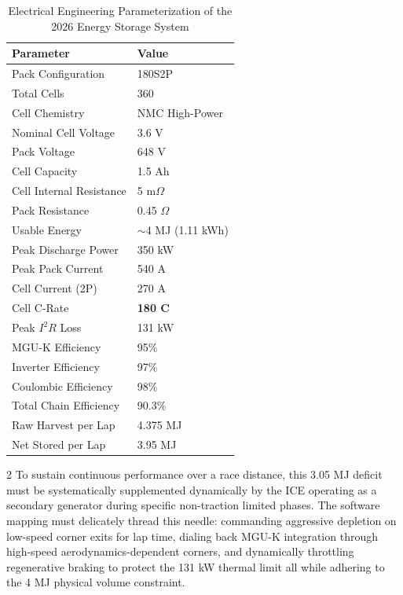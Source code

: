 \begin{table}[H]
\centering
\caption{Electrical Engineering Parameterization of the 2026 Energy Storage System}
\vspace{0.2cm}
\begin{tabularx}{\textwidth}{@{}XX@{}}
\toprule
\textbf{Parameter} & \textbf{Value} \\
\midrule
Pack Configuration & 180S2P \\
Total Cells & 360 \\
Cell Chemistry & NMC High-Power \\
Nominal Cell Voltage & 3.6 V \\
Pack Voltage & 648 V \\
Cell Capacity & 1.5 Ah \\
Cell Internal Resistance & 5 m$\Omega$ \\
Pack Resistance & 0.45 $\Omega$ \\
Usable Energy & $\sim$4 MJ (1.11 kWh) \\
Peak Discharge Power & 350 kW \\
Peak Pack Current & 540 A \\
Cell Current (2P) & 270 A \\
Cell C-Rate & \textbf{180 C} \\
Peak $I^2R$ Loss & 131 kW \\
MGU-K Efficiency & 95\% \\
Inverter Efficiency & 97\% \\
Coulombic Efficiency & 98\% \\
Total Chain Efficiency & 90.3\% \\
Raw Harvest per Lap & 4.375 MJ \\
Net Stored per Lap & 3.95 MJ \\
\bottomrule
\end{tabularx}
\label{tab:energy_params}
\end{table}

\begin{multicols}{2}
To sustain continuous performance over a race distance, this 3.05 MJ deficit must be systematically supplemented dynamically by the ICE operating as a secondary generator during specific non-traction limited phases. The software mapping must delicately thread this needle: commanding aggressive depletion on low-speed corner exits for lap time, dialing back MGU-K integration through high-speed aerodynamics-dependent corners, and dynamically throttling regenerative braking to protect the 131 kW thermal limit all while adhering to the 4 MJ physical volume constraint.
\end{multicols}
